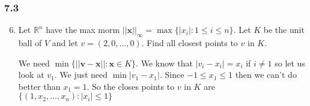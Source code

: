 \documentclass[letterpaper]{article}
\begin{document}
\renewcommand{\labelenumi}{\Alph{enumi}.}
\renewcommand{\labelenumii}{(\alph{enumii})}
\subsubsection*{7.3}
\begin{enumerate}
\setcounter{enumi}{5}
\item
Let $\mathbb{R}^n$ have the max morm $||\mathbf{x}||_\infty=\max\{|x_i|:1\le  i\le n\}$. Let $K$ be the unit ball of $V$ and let $v=(2,0,\dots,0)$. Find all closest points to $v$ in $K$. 

We need $\min\{||\mathbf{v}-\mathbf{x}||:\mathbf{x}\in K\}$. We know that $|v_i-x_i|=x_i$ if $i\ne 1$ so let us look at $v_1$. We just need $\min|v_1-x_1|$. Since $-1\le x_1\le 1$ then we can't do better than $x_1=1$. So the closes points to $v$ in $K$ are $\{(1,x_2,\dots,x_n):|x_i|\le 1\}$
\end{enumerate}
\end{document}
